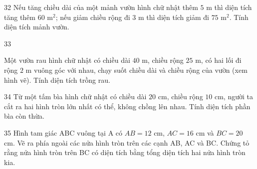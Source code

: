 \gap
\begin{probbox}{32}{}
Nếu tăng chiều dài của một mảnh vườn hình chữ nhật thêm $5$ m thì diện tích tăng thêm $60$ m$^2$; nếu giảm chiều rộng đi $3$ m thì diện tích giảm đi $75$ m$^2$. Tính diện tích mảnh vườn.
\end{probbox}
\gap
\begin{probbox}{33}{}
\begin{minipage}[t]{0.62\linewidth}
Một vườn rau hình chữ nhật có chiều dài $40$ m, chiều rộng $25$ m, có hai lối đi rộng $2$ m vuông góc với nhau, chạy suốt chiều dài và chiều rộng của vườn (xem hình vẽ). Tính diện tích trồng rau.
\end{minipage}\hfill
\begin{minipage}[t]{0.34\linewidth}\vspace{0pt}\centering
{}
\end{minipage}
\end{probbox}
\gap
\begin{probbox}{34}{}
Từ một tấm bìa hình chữ nhật có chiều dài $20$ cm, chiều rộng $10$ cm, người ta cắt ra hai hình tròn lớn nhất có thể, không chồng lên nhau. Tính diện tích phần bìa còn thừa.
\end{probbox}
\gap
\begin{probbox}{35}{}
Hình tam giác ABC vuông tại A có $AB=12$ cm, $AC=16$ cm và $BC=20$ cm. Vẽ ra phía ngoài các nửa hình tròn trên các cạnh AB, AC và BC. Chứng tỏ rằng nửa hình tròn trên BC có diện tích bằng tổng diện tích hai nửa hình tròn kia.
\end{probbox}
